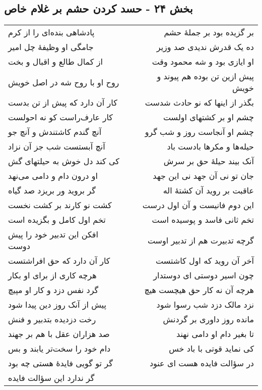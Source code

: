 \begin{center}
\section*{بخش ۲۴ - حسد کردن حشم بر غلام خاص}
\label{sec:sh024}
\begin{longtable}{l p{0.5cm} r}
پادشاهی بنده‌ای را از کرم
&&
بر گزیده بود بر جملهٔ حشم
\\
جامگی او وظیفهٔ چل امیر
&&
ده یک قدرش ندیدی صد وزیر
\\
از کمال طالع و اقبال و بخت
&&
او ایازی بود و شه محمود وقت
\\
روح او با روح شه در اصل خویش
&&
پیش ازین تن بوده هم پیوند و خویش
\\
کار آن دارد که پیش از تن بدست
&&
بگذر از اینها که نو حادث شدست
\\
کار عارف‌راست کو نه احولست
&&
چشم او بر کشتهای اولست
\\
آنچ گندم کاشتندش و آنچ جو
&&
چشم او آنجاست روز و شب گرو
\\
آنچ آبستست شب جز آن نزاد
&&
حیله‌ها و مکرها بادست باد
\\
کی کند دل خوش به حیلتهای گش
&&
آنک بیند حیلهٔ حق بر سرش
\\
او درون دام و دامی می‌نهد
&&
جان تو نی آن جهد نی این جهد
\\
گر بروید ور بریزد صد گیاه
&&
عاقبت بر روید آن کشتهٔ اله
\\
کشت نو کارند بر کشت نخست
&&
این دوم فانیست و آن اول درست
\\
تخم اول کامل و بگزیده است
&&
تخم ثانی فاسد و پوسیده است
\\
افکن این تدبیر خود را پیش دوست
&&
گرچه تدبیرت هم از تدبیر اوست
\\
کار آن دارد که حق افراشتست
&&
آخر آن روید که اول کاشتست
\\
هرچه کاری از برای او بکار
&&
چون اسیر دوستی ای دوستدار
\\
گرد نفس دزد و کار او مپیچ
&&
هرچه آن نه کار حق هیچست هیچ
\\
پیش از آنک روز دین پیدا شود
&&
نزد مالک دزد شب رسوا شود
\\
رخت دزدیده بتدبیر و فنش
&&
مانده روز داوری بر گردنش
\\
صد هزاران عقل با هم بر جهند
&&
تا بغیر دام او دامی نهند
\\
دام خود را سخت‌تر یابند و بس
&&
کی نماید قوتی با باد خس
\\
گر تو گویی فایدهٔ هستی چه بود
&&
در سؤالت فایده هست ای عنود
\\
گر ندارد این سؤالت فایده

\end{longtable}
\end{center}
